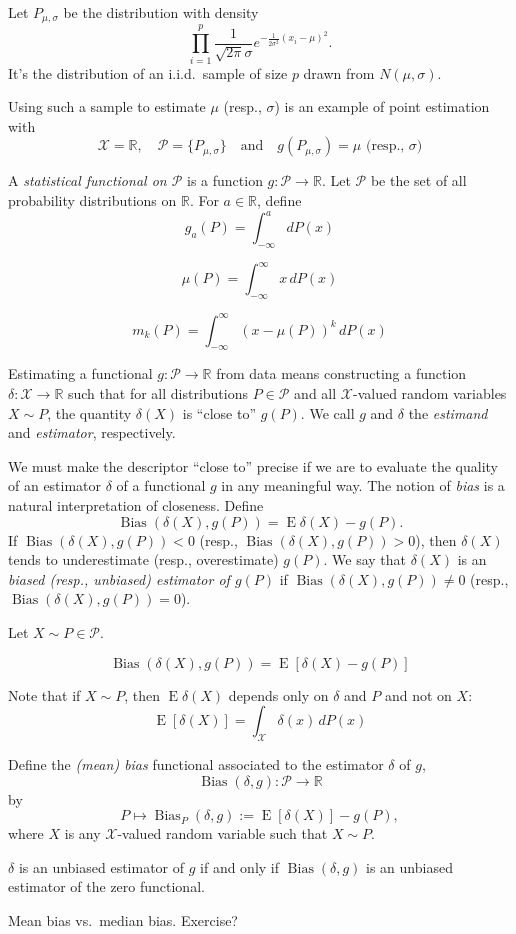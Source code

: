 \documentclass[12pt]{amsart}
\newcommand{\cP}{\mathscr{P}}
\newcommand{\cX}{\mathscr{X}}
\newcommand{\RR}{\mathbb{R}}
\newcommand{\lra}{\longrightarrow}
\newcommand{\iid}{i.i.d.\ }
\DeclareMathOperator{\Bias}{Bias}
\DeclareMathOperator{\EE}{E}
\begin{document}
Let $P_{\mu,\sigma}$ be the distribution with density
\[
\prod_{i=1}^p\frac1{\sqrt{2\pi}\sigma}e^{-\frac1{2\sigma^2}(x_i-\mu)^2}.
\]
It's the distribution of an \iid sample of size $p$ drawn from $N(\mu,\sigma)$.

Using such a sample to estimate $\mu$ (resp., $\sigma$) is an example of point estimation with
\[
\cX=\RR,\quad \cP=\{P_{\mu,\sigma}\}\quad\text{and}\quad
\text{$g(P_{\mu,\sigma})=\mu$ (resp., $\sigma)$}
\]

A \emph{statistical functional on $\cP$} is a function $g:\cP\to\RR$.
Let $\cP$ be the set of all probability distributions on $\RR$.
For $a\in\RR$, define $$g_a(P)=\int_{-\infty}^adP(x)$$

$$\mu(P)=\int_{-\infty}^\infty x\,dP(x)$$

$$m_k(P)=\int_{-\infty}^\infty (x-\mu(P))^k\,dP(x)$$

Estimating a functional $g:\cP\to\RR$ from data means
constructing a function $\delta:\cX\to\RR$ such that for all distributions $P\in\cP$ and all $\cX$-valued random variables $X\sim P$, the quantity $\delta(X)$ is ``close to'' $g(P)$.
We call $g$ and $\delta$ the \emph{estimand} and \emph{estimator}, respectively.

We must make the descriptor ``close to'' precise if we are to evaluate the quality of an estimator $\delta$ of a functional $g$ in any meaningful way.
The notion of \emph{bias} is a natural interpretation of closeness.
Define
\[
    \Bias(\delta(X), g(P)) = \EE\delta(X) - g(P).
\]
If $\Bias(\delta(X), g(P))<0$ (resp., $\Bias(\delta(X), g(P))>0$), then $\delta(X)$ tends to underestimate (resp., overestimate) $g(P)$.
We say that $\delta(X)$ is an \emph{biased (resp., unbiased) estimator of $g(P)$}
if $\Bias(\delta(X), g(P))\neq0$
(resp., $\Bias(\delta(X), g(P))=0$).


Let $X\sim P\in \cP$.

$$\Bias(\delta(X), g(P))=\EE[\delta(X) - g(P)]$$

Note that if $X\sim P$, then $\EE\delta(X)$ depends only on $\delta$ and $P$ and not on $X$:
\[
    \EE[\delta(X)] = \int_\cX\delta(x)\,dP(x)
\]

Define the \emph{(mean) bias} functional associated to the estimator $\delta$ of $g$,
\[
    \Bias(\delta, g):\cP\lra\RR
\]
by
\[
    P\mapsto\Bias_P(\delta, g) := \EE[\delta(X)] - g(P),
\]
where $X$ is any $\cX$-valued random variable such that $X\sim P$.

$\delta$ is an unbiased estimator of $g$ if and only if $\Bias(\delta, g)$ is an unbiased estimator of the zero functional.

Mean bias vs.\ median bias. Exercise?
\end{document}
